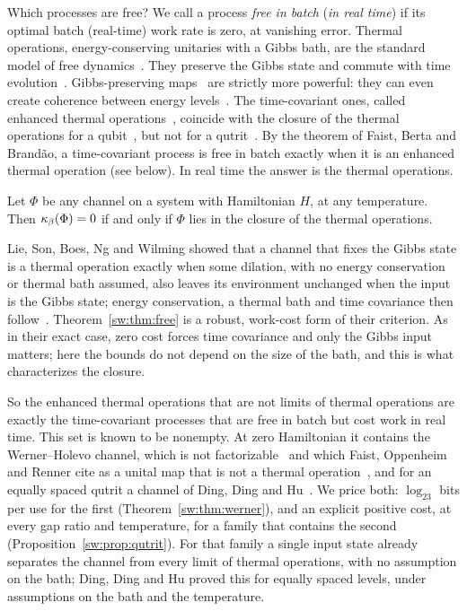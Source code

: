 Which processes are free? We call a process \emph{free in batch} (\emph{in real time}) if its optimal batch (real-time) work rate is zero, at vanishing error. Thermal operations, energy-conserving unitaries with a Gibbs bath, are the standard model of free dynamics~\cite{Janzing00,HorodeckiOppenheim13,Brandao13}. They preserve the Gibbs state and commute with time evolution~\cite{Lostaglio15}. Gibbs-preserving maps~\cite{Janzing00,FDOR15,FR18} are strictly more powerful: they can even create coherence between energy levels~\cite{FOR15}. The time-covariant ones, called enhanced thermal operations~\cite{Cwiklinski15}, coincide with the closure of the thermal operations for a qubit~\cite{Cwiklinski15,vomEnde22}, but not for a qutrit~\cite{Cwiklinski15,DingFengHu21}. By the theorem of Faist, Berta and Brand\~ao, a time-covariant process is free in batch exactly when it is an enhanced thermal operation (see below). In real time the answer is the thermal operations.

\begin{theorem}\label{sw:thm:free}
Let $\Phi$ be any channel on a system with Hamiltonian $H$, at any temperature. Then $\kappa_\beta(\Phi)=0$ if and only if $\Phi$ lies in the closure of the thermal operations.
\end{theorem}

Lie, Son, Boes, Ng and Wilming showed that a channel that fixes the Gibbs state is a thermal operation exactly when some dilation, with no energy conservation or thermal bath assumed, also leaves its environment unchanged when the input is the Gibbs state; energy conservation, a thermal bath and time covariance then follow~\cite[Prop.~4]{LieEtAl26}. Theorem~\ref{sw:thm:free} is a robust, work-cost form of their criterion. As in their exact case, zero cost forces time covariance and only the Gibbs input matters; here the bounds do not depend on the size of the bath, and this is what characterizes the closure.

So the enhanced thermal operations that are not limits of thermal operations are exactly the time-covariant processes that are free in batch but cost work in real time. This set is known to be nonempty. At zero Hamiltonian it contains the Werner--Holevo channel, which is not factorizable~\cite[Ex.~3.1]{HaagerupMusat11} and which Faist, Oppenheim and Renner cite as a unital map that is not a thermal operation~\cite{FOR15}, and for an equally spaced qutrit a channel of Ding, Ding and Hu~\cite{DingFengHu21}. We price both: $\log_23$ bits per use for the first (Theorem~\ref{sw:thm:werner}), and an explicit positive cost, at every gap ratio and temperature, for a family that contains the second (Proposition~\ref{sw:prop:qutrit}). For that family a single input state already separates the channel from every limit of thermal operations, with no assumption on the bath; Ding, Ding and Hu proved this for equally spaced levels, under assumptions on the bath and the temperature.

